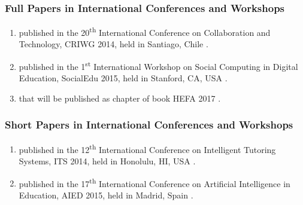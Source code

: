 \subsubsection*{Full Papers in International Conferences and Workshops}


\begin{enumerate}
\item
{} published in the 20\textsuperscript{th} International Conference on Collaboration and Technology, CRIWG 2014, held in Santiago, Chile \cite{ChallcoMoreiraMizoguchiIsotani2014}.

\item
{} published in the 1\textsuperscript{st} International Workshop on Social Computing in Digital Education, SocialEdu 2015, held in Stanford, CA, USA \cite{ChallcoMizoguchiBittencourtIsotani2015}.

\item
{} that will be published as chapter of book  HEFA 2017 \cite{ChallcoMizoguchiIsotani2017}.
\end{enumerate}


\subsubsection*{Short Papers in International Conferences and Workshops}

\begin{enumerate}
\item
{} published in the 12\textsuperscript{th} International Conference on Intelligent Tutoring Systems, ITS 2014, held in Honolulu, HI, USA \cite{ChallcoMoreiraMizoguchiIsotani2014a}.

\item
{} published in the 17\textsuperscript{th} International Conference on Artificial Intelligence in Education, AIED 2015, held in Madrid, Spain \cite{ChallcoMizoguchiBittencourtIsotani2015a}.
\end{enumerate}


